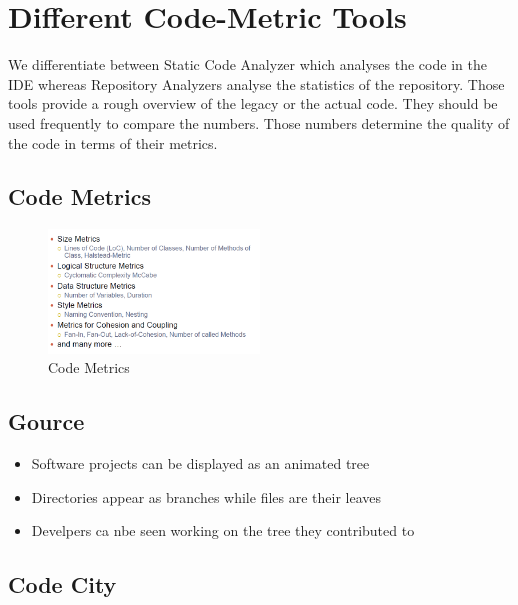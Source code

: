 \hypertarget{different-code-metric-tools}{%
\section{Different Code-Metric
Tools}\label{different-code-metric-tools}}
We differentiate between Static Code Analyzer which analyses the code in the IDE whereas Repository Analyzers analyse the statistics of the repository. Those tools provide a rough overview of the legacy or the actual code. They should be used frequently to compare the numbers. Those numbers determine the quality of the code in terms of their metrics.



\hypertarget{Code Metrics}{%
\subsection{Code Metrics}\label{Code-Metrics}}
\begin{figure}[H]
\centering
\includegraphics[width=0.5\textwidth]{figures/CodeMetrics.png}
\caption{Code Metrics}
\end{figure}




\hypertarget{gource}{%
\subsection{Gource}\label{gource}}

\begin{itemize}
\tightlist
\item
  Software projects can be displayed as an animated tree
\item
  Directories appear as branches while files are their leaves
\item
  Develpers ca nbe seen working on the tree they contributed to
\end{itemize}

\hypertarget{code-city}{%
\subsection{Code City}\label{code-city}}

